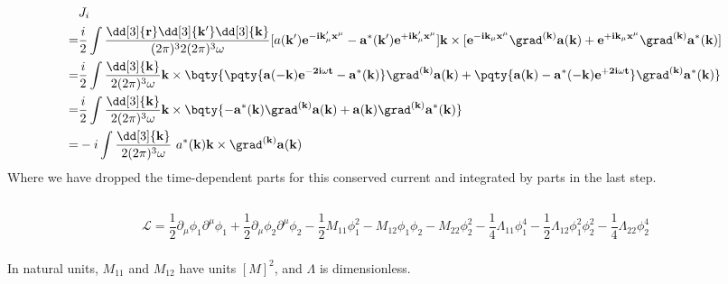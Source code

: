 \documentclass[12pt]{article}
\begin{document}
        \begin{align*}
            &J_i\\
            =& \frac{i}{2}\int \frac{{\dd[3]{\bf r}}\dd[3]{\bf k'}\dd[3]{\bf k}}{(2\pi)^32 (2\pi)^3 \omega }[{a(\bf k')e^{ - i k'_\mu x^\mu} - a^*(\bf k')e^{ + ik'_\mu x^\mu}}] \bf k \times [{e^{ - ik_\mu x^\mu} \grad^{(\bf k)}a(\bf k)+ e^{ + i k_\mu x^\mu}\grad^{(\bf k)}a^*(\bf k)}]\\
            =& \frac{i}{2} \int \frac{\dd[3]{\bf k}}{2(2\pi)^3\omega} \bf k \times \bqty{\pqty{a(\bf -\bf k)e^{ - 2i\omega t} - a^*(\bf k)} \grad^{(\bf k)}a(\bf k) +\pqty{a(\bf k) - a^*( -\bf k)e^{ + 2i\omega t}} \grad^{(\bf k)}a^*(\bf k)}\\
            =& \frac{i}{2} \int \frac{\dd[3]{\bf k}}{2(2\pi)^3\omega} \bf k \times \bqty{ -a^*(\bf k) \grad^{(\bf k)}a(\bf k) +a(\bf k) \grad^{(\bf k)}a^*(\bf k)}\\
            =& - i \int \frac{\dd[3]{\bf k}}{2(2\pi)^3\omega}\ a^*(\bf k) \bf k \times  \grad^{(\bf k)}a(\bf k) 
        \end{align*}
        Where we have dropped the time-dependent parts for this conserved current and integrated by parts in the last step.
        \subsection{} { \[
            \mathcal{L} = \frac{1}{2} \partial_\mu\phi_1 \partial^\mu \phi_1 + \frac{1}{2} \partial_\mu\phi_2 \partial^\mu \phi_2 - \frac{1}{2} M_{11} \phi_1^2 - M_{12}\phi_1\phi_2 - M_{22}\phi_2^2 - \frac{1}{4} \Lambda_{11}\phi_1^4 - \frac{1}{2}\Lambda_{12} \phi_1^2\phi_2^2 - \frac{1}{4} \Lambda_{22}\phi_2^4
        \]}
        \subsubsection{} In natural units, \(M_{11}\) and \(M_{12}\) have units \([M]^2\), and \(\Lambda\) is dimensionless.
\end{document}
